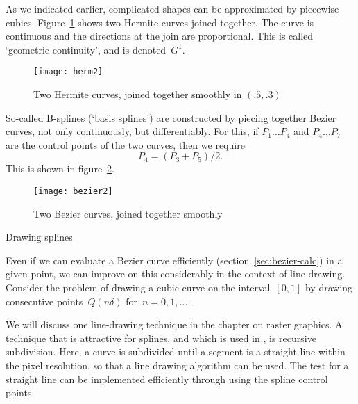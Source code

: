 As we indicated earlier, complicated shapes can be approximated by
piecewise cubics. Figure~\ref{fig:herm2} shows two Hermite curves
joined together. The curve is continuous and the directions at the
join are proportional. This is called `geometric continuity', and is denoted~$G^1$.
\begin{figure}[t]
\texttt{[image: herm2]}
\caption{Two Hermite curves, joined together smoothly in $(.5,.3)$}
\label{fig:herm2}
\end{figure}
So-called B-splines (`basis splines') are constructed
by piecing together Bezier curves, not only continuously, but
differentiably. For this, if $P_1\ldots P_4$ and $P_4\ldots P_7$ are
the control points of the two curves, then we require
\[ P_4=(P_3+P_5)/2. \]
This is shown in figure~\ref{fig:bezier2}.
\begin{figure}[t]
\texttt{[image: bezier2]}
\caption{Two Bezier curves, joined together smoothly}
\label{fig:bezier2}
\end{figure}

 {Drawing splines}

Even if we can evaluate a Bezier curve efficiently
(section~\ref{sec:bezier-calc}) in a given point, we can improve on
this considerably in the context of line drawing. Consider the problem
of drawing a cubic curve on the interval~$[0,1]$ by drawing
consecutive points~$Q(n\delta)$ for~$n=0,1,\ldots$.

We will discuss one line-drawing technique in the chapter on raster graphics.
A technique that is attractive for splines, and which is used in
\Metafont, is recursive subdivision. Here, a curve is subdivided until
a segment is a straight line within the pixel resolution, so that a
line drawing algorithm can be used. The test for a straight line can
be implemented efficiently through using the spline control points.

\endinput

\Level 1 {Bezier curves according to Knuth}

MT:43,44
\[ z(t) = 3t^2-2t^3+re^{i\theta}t(1-t)^2-se^{-i\phi}t^2(1-t) \]


\Level 1 {Other facts}

The blending function is always a polynomial one degree less than the
number of control points. Thus 3 control points results in a parabola,
4 control points a cubic curve etc.


